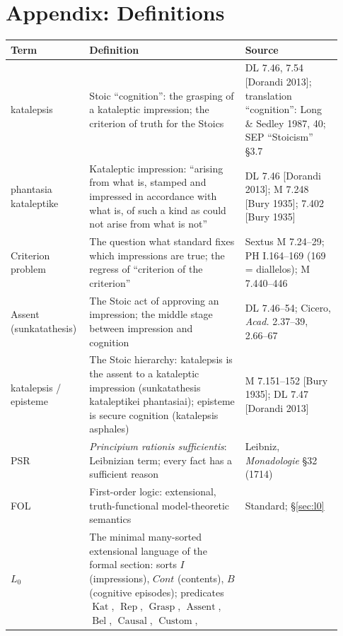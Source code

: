 \documentclass[11pt]{article}
\theoremstyle{plain}
\theoremstyle{definition}
\theoremstyle{remark}
\begin{document}
\section{Appendix: Definitions}
\label{sec:appendix}

\begin{center}
\begin{longtable}{p{0.20\linewidth} p{0.45\linewidth} p{0.28\linewidth}}
\hline
\textbf{Term} & \textbf{Definition} & \textbf{Source} \\
\hline
katalepsis &
Stoic ``cognition'': the grasping of a kataleptic impression; the
criterion of truth for the Stoics &
DL 7.46, 7.54 [Dorandi 2013]; translation ``cognition'': Long \&
Sedley 1987, 40; SEP ``Stoicism'' \S3.7 \\
\hline
phantasia kataleptike &
Kataleptic impression: ``arising from what is, stamped and impressed
in accordance with what is, of such a kind as could not arise from
what is not'' &
DL 7.46 [Dorandi 2013]; M 7.248 [Bury 1935]; 7.402 [Bury 1935] \\
\hline
Criterion problem &
The question what standard fixes which impressions are true; the
regress of ``criterion of the criterion'' &
Sextus M 7.24--29; PH I.164--169 (169 = diallelos); M 7.440--446 \\
\hline
Assent (sunkatathesis) &
The Stoic act of approving an impression; the middle stage between
impression and cognition &
DL 7.46--54; Cicero, \emph{Acad.} 2.37--39, 2.66--67 \\
\hline
katalepsis / episteme &
The Stoic hierarchy: katalepsis is the assent to a kataleptic
impression (sunkatathesis kataleptikei phantasiai); episteme is
secure cognition (katalepsis asphales) &
M 7.151--152 [Bury 1935]; DL 7.47 [Dorandi 2013] \\
\hline
PSR &
\emph{Principium rationis sufficientis}: Leibnizian term; every fact
has a sufficient reason &
Leibniz, \emph{Monadologie} \S32 (1714) \\
\hline
FOL &
First-order logic: extensional, truth-functional model-theoretic
semantics &
Standard; \S\ref{sec:l0} \\
\hline
$L_0$ &
The minimal many-sorted extensional language of the formal section:
sorts $I$ (impressions), $\mathit{Cont}$ (contents), $B$ (cognitive
episodes); predicates $\operatorname{Kat}$, $\operatorname{Rep}$,
$\operatorname{Grasp}$, $\operatorname{Assent}$,
$\operatorname{Bel}$, $\operatorname{Causal}$, $\operatorname{Custom}$,

\end{longtable}
\end{center}
\end{document}
